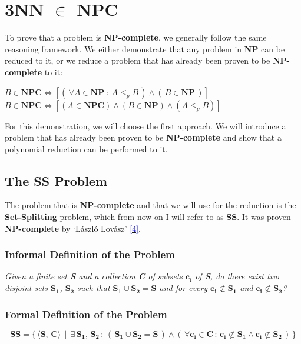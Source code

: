 \documentclass[../main]{subfiles}
\begin{document}
\section{3NN $\in$ NPC}
To prove that a problem is \textbf{NP-complete}, we generally follow the same reasoning framework. We either demonstrate that any problem in \textbf{NP} can be reduced to it, or we reduce a problem that has already been proven to be \textbf{NP-complete} to it: \vspace{1mm}
\begin{center}
    $B \in \textbf{NPC} \Longleftrightarrow [(\, \forall A \in \textbf{NP}\ :\ A \leq_p B\, ) \land (\,B \in \textbf{NP}\, )]$
    $B \in \textbf{NPC} \Longleftrightarrow
[(A \in \textbf{NPC}) \land (B \in \textbf{NP}) \land (A \leq_p B)]$
\end{center} 
For this demonstration, we will choose the first approach. We will introduce a problem that has already been proven to be \textbf{NP-complete} and show that a polynomial reduction can be performed to it.
\subsection{The SS Problem}
The problem that is \textbf{NP-complete} and that we will use for the reduction is the \textbf{Set-Splitting} problem, which from now on I will refer to as \textbf{SS}. It was proven \textbf{NP-complete} by `László Lovász' \hyperlink{target:zona}{\textcolor{blue}{[4]}}.

\subsubsection{Informal Definition of the Problem}
\begin{center}
    \textit{Given a finite set \textbf{S} and a collection \textbf{C} of subsets $\textbf{c}_\textbf{i}$ of \textbf{S}, do there exist two disjoint sets $\textbf{S}_\textbf{1}$, $\textbf{S}_\textbf{2}$ such that $\textbf{S}_\textbf{1} \cup \textbf{S}_\textbf{2} = \textbf{S}$ and for every $\textbf{c}_\textbf{i} \not\subset \textbf{S}_\textbf{1}$ and $\textbf{c}_\textbf{i} \not\subset \textbf{S}_\textbf{2}$?}
\end{center}

\subsubsection{Formal Definition of the Problem}
\begin{equation*}
    \textbf{SS} = \{\, \langle \textbf{S}, \, \textbf{C} \rangle \ \ | \ \ \exists \, \textbf{S}_\textbf{1},\, \textbf{S}_\textbf{2} \, : \, (\,\textbf{S}_\textbf{1} \cup \textbf{S}_\textbf{2} = \textbf{S}\,) \land (\,\forall \textbf{c}_\textbf{i} \in \textbf{C} \,: \, \textbf{c}_\textbf{i} \not\subset \textbf{S}_\textbf{1} \land \textbf{c}_\textbf{i} \not\subset \textbf{S}_\textbf{2}\,)\, \}
\end{equation*}
\end{document}
